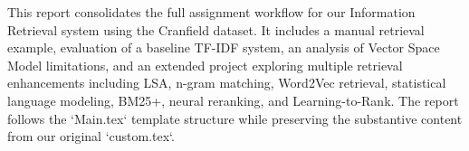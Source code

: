 This report consolidates the full assignment workflow for our Information Retrieval system using the Cranfield dataset. It includes a manual retrieval example, evaluation of a baseline TF-IDF system, an analysis of Vector Space Model limitations, and an extended project exploring multiple retrieval enhancements including LSA, n-gram matching, Word2Vec retrieval, statistical language modeling, BM25+, neural reranking, and Learning-to-Rank. The report follows the `Main.tex` template structure while preserving the substantive content from our original `custom.tex`.

